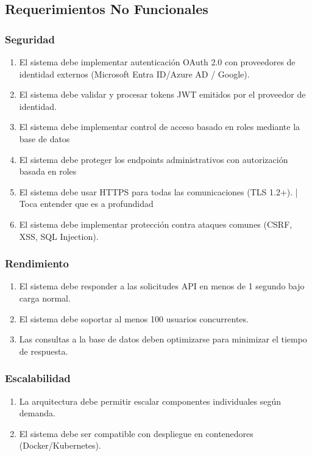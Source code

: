 \documentclass[11pt,a4paper]{article}
\newcommand{\reqnum}[1]{\textbf{\underline{RF-#1}}}
\begin{document}
\subsection{Requerimientos No Funcionales}

\subsubsection{Seguridad}
\begin{enumerate}[leftmargin=*,labelwidth=2.5cm,align=left]
	\item[\reqnum{026}] El sistema debe implementar autenticación OAuth 2.0 con proveedores de identidad externos (Microsoft Entra ID/Azure AD / Google).
	\item[\reqnum{027}] El sistema debe validar y procesar tokens JWT emitidos por el proveedor de identidad.
	\item[\reqnum{028}] El sistema debe implementar control de acceso basado en roles mediante la base de datos
	\item[\reqnum{029}] El sistema debe proteger los endpoints administrativos con autorización basada en roles
	\item[\reqnum{030}] El sistema debe usar HTTPS para todas las comunicaciones (TLS 1.2+). | Toca entender que es a profundidad
	\item[\reqnum{031}] El sistema debe implementar protección contra ataques comunes (CSRF, XSS, SQL Injection).
\end{enumerate}

\subsubsection{Rendimiento}
\begin{enumerate}[leftmargin=*,labelwidth=2.5cm,align=left,start=32]
	\item[\reqnum{032}] El sistema debe responder a las solicitudes API en menos de 1 segundo bajo carga normal.
	\item[\reqnum{033}] El sistema debe soportar al menos 100 usuarios concurrentes.
	\item[\reqnum{034}] Las consultas a la base de datos deben optimizarse para minimizar el tiempo de respuesta.
\end{enumerate}

\subsubsection{Escalabilidad}
\begin{enumerate}[leftmargin=*,labelwidth=2.5cm,align=left,start=35]
	\item[\reqnum{035}] La arquitectura debe permitir escalar componentes individuales según demanda.
	\item[\reqnum{036}] El sistema debe ser compatible con despliegue en contenedores (Docker/Kubernetes).
\end{enumerate}
\end{document}
